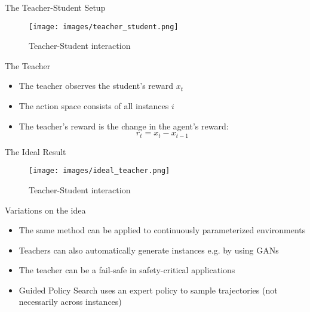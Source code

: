 \documentclass[aspectratio=169]{../latex_main/tntbeamer}  %
\begin{document}
\begin{frame}[c]{The Teacher-Student Setup~}
	
	\begin{figure}
	\centering
	\texttt{[image: images/teacher\_student.png]}
	\caption{Teacher-Student interaction}
	\end{figure}
	
\end{frame}

\begin{frame}[c]{The Teacher}
	\begin{itemize}
		\item The teacher observes the student's reward $x_t$
		\item The action space consists of all instances $i$
		\item The teacher's reward is the change in the agent's reward:
			$$ r_t = x_t - x_{t-1}$$
	\end{itemize}
	
\end{frame}

\begin{frame}[c]{The Ideal Result~}
	
	\begin{figure}
	\centering
	\texttt{[image: images/ideal\_teacher.png]}
	\caption{Teacher-Student interaction}
	\end{figure}

\end{frame}


\begin{frame}[c]{Variations on the idea}

	\begin{itemize}
		\item The same method can be applied to continuously parameterized environments 
		\item Teachers can also automatically generate instances e.g. by using GANs~
		\item The teacher can be a fail-safe in safety-critical applications 
		\item Guided Policy Search  uses an expert policy to sample trajectories (not necessarily across instances)
	\end{itemize}

\end{frame}

\end{document}
